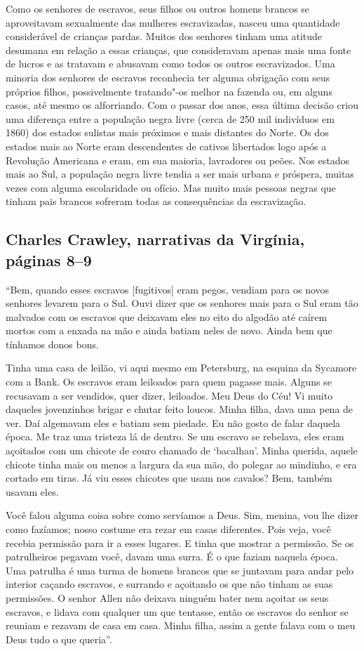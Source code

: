 {Como os senhores de escravos, seus filhos ou outros homens brancos
se aproveitavam sexualmente das mulheres escravizadas, nasceu uma quantidade
considerável de crianças pardas. Muitos dos senhores tinham
uma atitude desumana em relação a essas crianças, que consideravam
apenas mais uma fonte de lucros e as tratavam e abusavam como todos os
outros escravizados. Uma minoria dos senhores de escravos reconhecia ter
alguma obrigação com seus próprios filhos, possivelmente tratando"-os
melhor na fazenda ou, em alguns casos, até mesmo os alforriando. Com o
passar dos anos, essa última decisão criou uma diferença entre a
população negra livre (cerca de 250 mil indivíduos em 1860) dos estados
sulistas mais próximos e mais distantes do Norte. Os dos estados mais ao
Norte eram descendentes de cativos libertados logo após a Revolução
Americana e eram, em sua maioria, lavradores ou peões. Nos estados mais
ao Sul, a população negra livre tendia a ser mais urbana e próspera,
muitas vezes com alguma escolaridade ou ofício. Mas muito mais pessoas
negras que tinham pais brancos sofreram todas as consequências da
escravização.
}

\subsection{Charles Crawley, narrativas da Virgínia, páginas 8--9} \label{ref61}

``Bem, quando esses escravos {[}fugitivos{]} eram pegos, vendiam para os
novos senhores levarem para o Sul. Ouvi dizer que os senhores mais para
o Sul eram tão malvados com os escravos que deixavam eles no eito do
algodão até caírem mortos com a enxada na mão e ainda batiam neles de
novo. Ainda bem que tínhamos donos bons.

Tinha uma casa de leilão, vi aqui mesmo em Petersburg, na esquina da
Sycamore com a Bank. Os escravos eram leiloados para quem pagasse mais.
Alguns se recusavam a ser vendidos, quer dizer, leiloados. Meu Deus do
Céu! Vi muito daqueles jovenzinhos brigar e chutar feito loucos. Minha
filha, dava uma pena de ver. Daí algemavam eles e batiam sem piedade. Eu
não gosto de falar daquela época. Me traz uma tristeza lá de dentro. Se
um escravo se rebelava, eles eram açoitados com um chicote de couro
chamado de `bacalhau'. Minha querida, aquele chicote tinha mais ou menos
a largura da sua mão, do polegar ao mindinho, e era cortado em tiras. Já
viu esses chicotes que usam nos cavalos? Bem, também usavam eles.

Você falou alguma coisa sobre como servíamos a Deus. Sim, menina, vou
lhe dizer como fazíamos; nosso costume era rezar em casas diferentes.
Pois veja, você recebia permissão para ir a esses lugares. E tinha que
mostrar a permissão. Se os patrulheiros pegavam você, davam uma surra. É
o que faziam naquela época. Uma patrulha é uma turma de homens brancos
que se juntavam para andar pelo interior caçando escravos, e surrando e
açoitando os que não tinham as suas permissões. O senhor Allen não
deixava ninguém bater nem açoitar os seus escravos, e lidava com
qualquer um que tentasse, então os escravos do senhor se reuniam e
rezavam de casa em casa. Minha filha, assim a gente falava com o meu
Deus tudo o que queria''.

